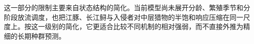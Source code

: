这一部分的限制主要来自状态结构的简化。当前模型尚未展开分龄、繁殖季节和分阶段放流调度，也把江豚、长江鲟与入侵者对中层猎物的半饱和响应压缩在同一尺度上。按这一级别的简化，它更适合比较不同机制的相对强弱，而不直接外推为精细的长期种群预测。

